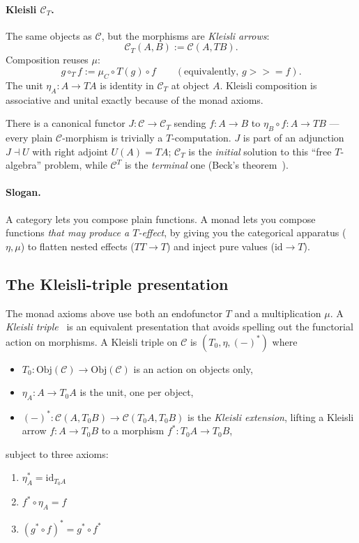 \documentclass[11pt]{article}
\newcommand{\id}{\mathrm{id}}
\newcommand{\Obj}{\mathrm{Obj}}
\newcommand{\bind}{\mathbin{>\!\!\!>\!\!=}}
\begin{document}
\paragraph{Kleisli $\mathcal{C}_T$.}
The same objects as $\mathcal{C}$, but the morphisms are
\emph{Kleisli arrows}:
\[
  \mathcal{C}_T(A, B) := \mathcal{C}(A, T B).
\]
Composition reuses $\mu$:
\[
  g \circ_T f := \mu_C \circ T(g) \circ f
            \qquad (\text{equivalently, } g \bind f).
\]
The unit $\eta_A : A \to T A$ is identity in $\mathcal{C}_T$ at object
$A$.  Kleisli composition is associative and unital exactly because of
the monad axioms.

There is a canonical functor $J : \mathcal{C} \to \mathcal{C}_T$
sending $f : A \to B$ to $\eta_B \circ f : A \to T B$ --- every plain
$\mathcal{C}$-morphism is trivially a $T$-computation.  $J$ is part
of an adjunction $J \dashv U$ with right adjoint $U(A) = T A$;
$\mathcal{C}_T$ is the \emph{initial} solution to this
``free $T$-algebra'' problem, while $\mathcal{C}^T$ is the
\emph{terminal} one (Beck's theorem~\cite{Beck}).

\paragraph{Slogan.}
A category lets you compose plain functions.  A monad lets you
compose functions \emph{that may produce a $T$-effect}, by giving you
the categorical apparatus ($\eta, \mu$) to flatten nested effects
($T T \to T$) and inject pure values ($\id \to T$).

\subsection{The Kleisli-triple presentation}

The monad axioms above use both an endofunctor $T$ and a
multiplication $\mu$.  A \emph{Kleisli triple}~\cite{Manes} is an
equivalent presentation that avoids spelling out the functorial
action on morphisms.  A Kleisli triple on $\mathcal{C}$ is
$(T_0, \eta, (-)^*)$ where
\begin{itemize}
  \item $T_0 : \Obj(\mathcal{C}) \to \Obj(\mathcal{C})$ is an action
        on objects only,
  \item $\eta_A : A \to T_0 A$ is the unit, one per object,
  \item $(-)^* : \mathcal{C}(A, T_0 B) \to \mathcal{C}(T_0 A, T_0 B)$
        is the \emph{Kleisli extension}, lifting a Kleisli arrow
        $f : A \to T_0 B$ to a morphism $f^* : T_0 A \to T_0 B$,
\end{itemize}
subject to three axioms:
\begin{enumerate}
  \item $\eta_A^* = \id_{T_0 A}$
  \item $f^* \circ \eta_A = f$
  \item $(g^* \circ f)^* = g^* \circ f^*$
\end{enumerate}
\end{document}

